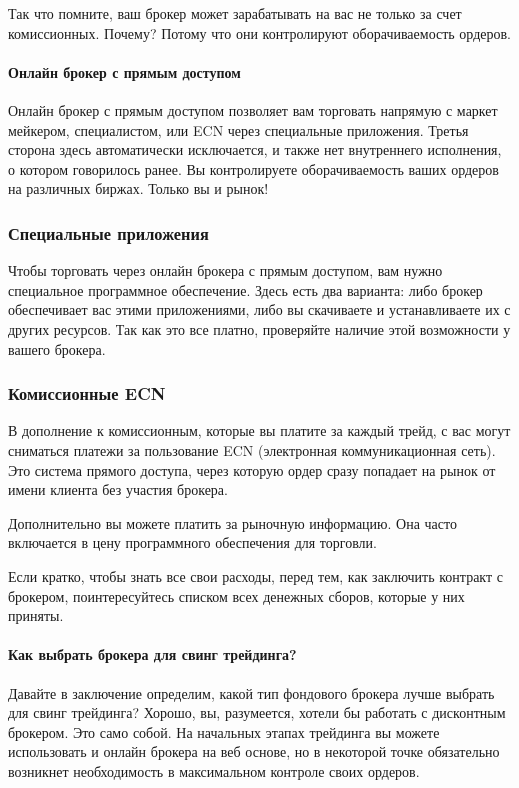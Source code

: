 \documentclass[a5paper]{article}
\begin{document}
Так что помните, ваш брокер может зарабатывать на вас не только за
счет комиссионных. Почему? Потому что они контролируют оборачиваемость
ордеров.

\paragraph{Онлайн брокер с прямым доступом}

Онлайн брокер с прямым доступом позволяет вам торговать напрямую с
маркет мейкером, специалистом, или ECN через специальные
приложения. Третья сторона здесь автоматически исключается, и также
нет внутреннего исполнения, о котором говорилось ранее. Вы
контролируете оборачиваемость ваших ордеров на различных
биржах. Только вы и рынок!

\subsubsection{Специальные приложения}

Чтобы торговать через онлайн брокера с прямым доступом, вам нужно
специальное программное обеспечение. Здесь есть два варианта: либо
брокер обеспечивает вас этими приложениями, либо вы скачиваете и
устанавливаете их с других ресурсов. Так как это все платно,
проверяйте наличие этой возможности у вашего брокера.

\subsubsection{Комиссионные ECN}

В дополнение к комиссионным, которые вы платите за каждый трейд, с вас могут сниматься платежи за пользование ECN (электронная коммуникационная сеть). Это система прямого доступа, через которую ордер сразу попадает на рынок от имени клиента без участия брокера.

Дополнительно вы можете платить за рыночную информацию. Она часто включается в цену программного обеспечения для торговли.

Если кратко, чтобы знать все свои расходы, перед тем, как заключить
контракт с брокером, поинтересуйтесь списком всех денежных сборов,
которые у них приняты.

\paragraph{Как выбрать брокера для свинг трейдинга?}

Давайте в заключение определим, какой тип фондового брокера лучше выбрать для свинг трейдинга? Хорошо, вы, разумеется, хотели бы работать с дисконтным брокером. Это само собой. На начальных этапах трейдинга вы можете использовать и онлайн брокера на веб основе, но в некоторой точке обязательно возникнет необходимость в максимальном контроле своих ордеров.
\end{document}
